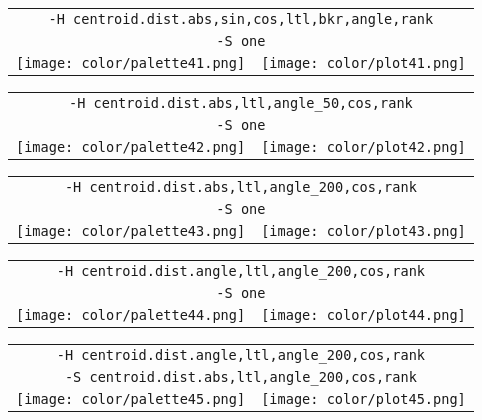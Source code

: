 \documentclass{article}
\begin{document}
\begin{center}
\begin{tabular}{m{8cm}m{8cm}}
\multicolumn{2}{c}{\tt -H centroid.dist.abs,sin,cos,ltl,bkr,angle,rank} \\
\multicolumn{2}{c}{\tt -S one} \\
\texttt{[image: color/palette41.png]} &
\texttt{[image: color/plot41.png]}
\end{tabular}
\end{center}

\begin{center}
\begin{tabular}{m{8cm}m{8cm}}
\multicolumn{2}{c}{\tt -H centroid.dist.abs,ltl,angle\_50,cos,rank} \\
\multicolumn{2}{c}{\tt -S one} \\
\texttt{[image: color/palette42.png]} &
\texttt{[image: color/plot42.png]}
\end{tabular}
\end{center}

\begin{center}
\begin{tabular}{m{8cm}m{8cm}}
\multicolumn{2}{c}{\tt -H centroid.dist.abs,ltl,angle\_200,cos,rank} \\
\multicolumn{2}{c}{\tt -S one} \\
\texttt{[image: color/palette43.png]} &
\texttt{[image: color/plot43.png]}
\end{tabular}
\end{center}

\begin{center}
\begin{tabular}{m{8cm}m{8cm}}
\multicolumn{2}{c}{\tt -H centroid.dist.angle,ltl,angle\_200,cos,rank} \\
\multicolumn{2}{c}{\tt -S one} \\
\texttt{[image: color/palette44.png]} &
\texttt{[image: color/plot44.png]}
\end{tabular}
\end{center}

\begin{center}
\begin{tabular}{m{8cm}m{8cm}}
\multicolumn{2}{c}{\tt -H centroid.dist.angle,ltl,angle\_200,cos,rank} \\
\multicolumn{2}{c}{\tt -S centroid.dist.abs,ltl,angle\_200,cos,rank} \\
\texttt{[image: color/palette45.png]} &
\texttt{[image: color/plot45.png]}
\end{tabular}
\end{center}
\end{document}
